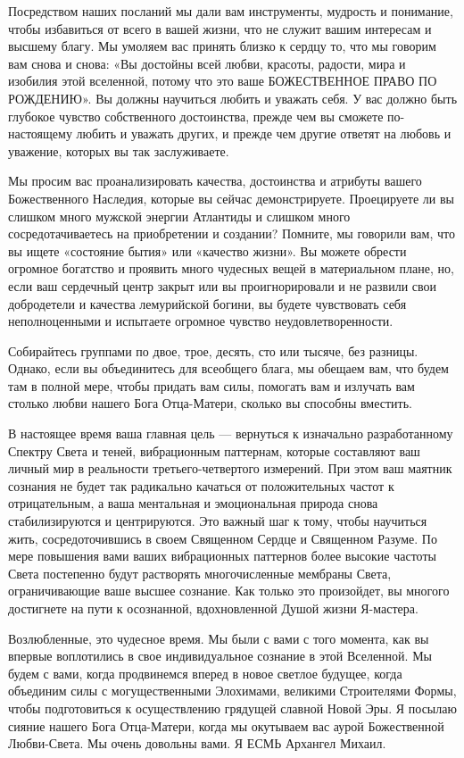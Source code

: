 Посредством наших посланий мы дали вам инструменты, мудрость и понимание, чтобы
избавиться от всего в вашей жизни, что не служит вашим интересам и высшему
благу. Мы умоляем вас принять близко к сердцу то, что мы говорим вам снова и
снова: «Вы достойны всей любви, красоты, радости, мира и изобилия этой
вселенной, потому что это ваше БОЖЕСТВЕННОЕ ПРАВО ПО РОЖДЕНИЮ». Вы должны
научиться любить и уважать себя. У вас должно быть глубокое чувство
собственного достоинства, прежде чем вы сможете по-настоящему любить и уважать
других, и прежде чем другие ответят на любовь и уважение, которых вы так
заслуживаете.

Мы просим вас проанализировать качества, достоинства и атрибуты вашего
Божественного Наследия, которые вы сейчас демонстрируете. Проецируете ли вы
слишком много мужской энергии Атлантиды и слишком много сосредотачиваетесь на
приобретении и создании? Помните, мы говорили вам, что вы ищете «состояние
бытия» или «качество жизни». Вы можете обрести огромное богатство и проявить
много чудесных вещей в материальном плане, но, если ваш сердечный центр закрыт
или вы проигнорировали и не развили свои добродетели и качества лемурийской
богини, вы будете чувствовать себя неполноценными и испытаете огромное чувство
неудовлетворенности.

Собирайтесь группами по двое, трое, десять, сто или тысяче, без разницы.
Однако, если вы объединитесь для всеобщего блага, мы обещаем вам, что будем там
в полной мере, чтобы придать вам силы, помогать вам и излучать вам столько
любви нашего Бога Отца-Матери, сколько вы способны вместить.

В настоящее время ваша главная цель — вернуться к изначально разработанному
Спектру Света и теней, вибрационным паттернам, которые составляют ваш личный
мир в реальности третьего-четвертого измерений. При этом ваш маятник сознания
не будет так радикально качаться от положительных частот к отрицательным, а
ваша ментальная и эмоциональная природа снова стабилизируются и центрируются.
Это важный шаг к тому, чтобы научиться жить, сосредоточившись в своем Священном
Сердце и Священном Разуме.  По мере повышения вами ваших вибрационных паттернов
более высокие частоты Света постепенно будут растворять многочисленные мембраны
Света, ограничивающие ваше высшее сознание. Как только это произойдет, вы
многого достигнете на пути к осознанной, вдохновленной Душой жизни Я-мастера.

Возлюбленные, это чудесное время. Мы были с вами с того момента, как вы впервые
воплотились в свое индивидуальное сознание в этой Вселенной. Мы будем с вами,
когда продвинемся вперед в новое светлое будущее, когда объединим силы с
могущественными Элохимами, великими Строителями Формы, чтобы подготовиться к
осуществлению грядущей славной Новой Эры. Я посылаю сияние нашего Бога
Отца-Матери, когда мы окутываем вас аурой Божественной Любви-Света. Мы очень
довольны вами. Я ЕСМЬ Архангел Михаил.
